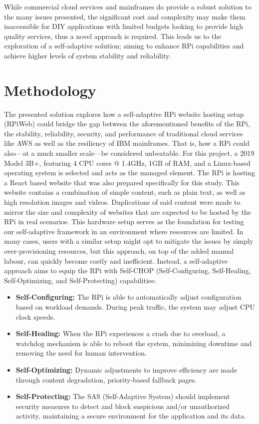 \documentclass[conference]{IEEEtran}
\begin{document}
While commercial cloud services and mainframes do provide a robust solution to the many issues presented, the significant cost and complexity may make them inaccessible for DIY applications with limited budgets looking to provide high quality services, thus a novel approach is required. This leads us to the exploration of a self-adaptive solution; aiming to enhance RPi capabilities and achieve higher levels of system stability and reliability.

\section{\textbf{Methodology}}\label{methodology}
The presented solution explores how a self-adaptive RPi website hosting setup (RPiWeb) could bridge the gap between the aforementioned benefits of the RPi, the stability, reliability, security, and performance of traditional cloud services like AWS as well as the resiliency of IBM mainframes. That is, how a RPi could also—at a much smaller scale—be considered unbeatable. For this project, a 2019 Model 3B+, featuring 4 CPU cores @ 1.4GHz, 1GB of RAM, and a Linux-based operating system is selected and acts as the managed element. The RPi is hosting a React based website that was also prepared specifically for this study. This website contains a combination of simple content, such as plain text, as well as high resolution images and videos. Duplications of said content were made to mirror the size and complexity of websites that are expected to be hosted by the RPi in real scenarios. This hardware setup serves as the foundation for testing our self-adaptive framework in an environment where resources are limited. In many cases, users with a similar setup might opt to mitigate the issues by simply over-provisioning resources, but this approach, on top of the added manual labour, can quickly become costly and inefficient. Instead, a self-adaptive approach aims to equip the RPi with Self-CHOP (Self-Configuring, Self-Healing, Self-Optimizing, and Self-Protecting) capabilities:

\begin{itemize}
    \item \textbf{Self-Configuring:}
          The RPi is able to automatically adjust configuration based on workload demands. During peak traffic, the system may adjust CPU clock speeds.
    \item \textbf{Self-Healing:}
          When the RPi experiences a crash due to overload, a watchdog mechanism is able to reboot the system, minimizing downtime and removing the need for human intervention.
    \item \textbf{Self-Optimizing:}
          Dynamic adjustments to improve efficiency are made through content degradation, priority-based fallback pages.
    \item \textbf{Self-Protecting:}
          The SAS (Self-Adaptive System) should implement security measures to detect and block suspicious and/or unauthorized activity, maintaining a secure environment for the application and its data.
\end{itemize}
\end{document}
